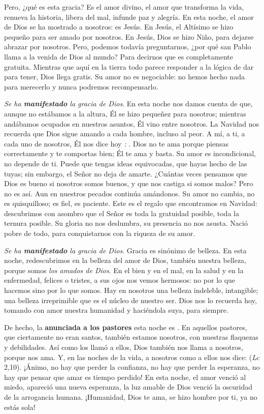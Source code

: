 Pero, ¿qué es esta gracia? Es el amor divino, el amor que transforma la vida, renueva la historia, libera del mal, infunde paz y alegría. En esta noche, el amor de Dios se ha mostrado a nosotros: es Jesús. En Jesús, el Altísimo se hizo pequeño para ser amado por nosotros. En Jesús, Dios se hizo Niño, para dejarse abrazar por nosotros. Pero, podemos todavía preguntarnos, ¿por qué san Pablo llama  a la venida de Dios al mundo? Para decirnos que es completamente gratuita. Mientras que aquí en la tierra todo parece responder a la lógica de dar para tener, Dios llega gratis. Su amor no es negociable: no hemos hecho nada para merecerlo y nunca podremos recompensarlo.

\emph{Se ha \textbf{manifestado} la gracia de Dios}. En esta noche nos damos cuenta de que, aunque no estábamos a la altura, Él se hizo pequeñez para nosotros; mientras andábamos ocupados en nuestros asuntos, Él vino entre nosotros. La Navidad nos recuerda que Dios sigue amando a cada hombre, incluso al peor. A mí, a ti, a cada uno de nosotros, Él nos dice hoy \emph{:} . Dios no te ama porque piensas correctamente y te comportas bien; Él te ama y basta. Su amor es incondicional, no depende de ti. Puede que tengas ideas equivocadas, que hayas hecho de las tuyas; sin embargo, el Señor no deja de amarte. ¿Cuántas veces pensamos que Dios es bueno si nosotros somos buenos, y que nos castiga si somos malos? Pero no es así. Aun en nuestros pecados continúa amándonos. Su amor no cambia, no es quisquilloso; es fiel, es paciente. Este es el regalo que encontramos en Navidad: descubrimos con asombro que el Señor es toda la gratuidad posible, toda la ternura posible. Su gloria no nos deslumbra, su presencia no nos asusta. Nació pobre de todo, para conquistarnos con la riqueza de su amor.

\emph{Se ha \textbf{manifestado} la gracia de Dios}. Gracia es sinónimo de belleza. En esta noche, redescubrimos en la belleza del amor de Dios, también nuestra belleza, porque somos \emph{los amados de Dios}. En el bien y en el mal, en la salud y en la enfermedad, felices o tristes, a sus ojos nos vemos hermosos: no por lo que hacemos sino por lo que somos. Hay en nosotros una belleza indeleble, intangible; una belleza irreprimible que es el núcleo de nuestro ser. Dios nos lo recuerda hoy, tomando con amor nuestra humanidad y haciéndola suya,  para siempre.

De hecho, la \textbf{ anunciada a los pastores} esta noche es . En aquellos pastores, que ciertamente no eran santos, también estamos nosotros, con nuestras flaquezas y debilidades. Así como los llamó a ellos, Dios también nos llama a nosotros, porque nos ama. Y, en las noches de la vida, a nosotros como a ellos nos dice:  (\emph{Lc} 2,10). ¡Ánimo, no hay que perder la confianza, no hay que perder la esperanza, no hay que pensar que amar es tiempo perdido! En esta noche, el amor venció al miedo, apareció una nueva esperanza, la luz amable de Dios venció la oscuridad de la arrogancia humana. ¡Humanidad, Dios te ama, se hizo hombre por ti, ya no estás sola!

